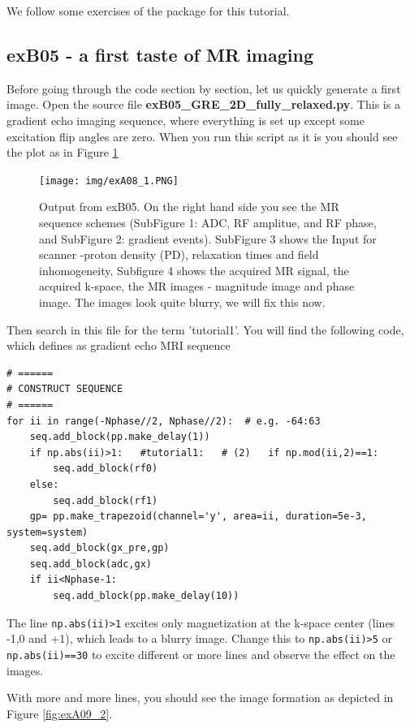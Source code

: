 \documentclass[a4paper,12pt]{extarticle}
\begin{document}
We follow some exercises of the package for this tutorial.

\subsection{exB05 - a first taste of MR imaging}
Before going through the code section by section, let us quickly generate a first image. Open the source file \textbf{exB05\_GRE\_2D\_fully\_relaxed.py}. This is a gradient echo imaging sequence, where everything is set up except some excitation flip angles are zero. When you run this script as it is you should see the plot as in Figure \ref{fig:exA08_1}

\begin{figure}[!ht] 
\centering
\texttt{[image: img/exA08\_1.PNG]}
\caption{Output from exB05. On the right hand side you see the MR sequence schemes (SubFigure 1: ADC, RF amplitue, and RF phase, and SubFigure 2: gradient events). SubFigure 3 shows the Input for scanner -proton density (PD), relaxation times and field inhomogeneity. Subfigure 4 shows the acquired MR signal, the acquired k-space, the MR images - magnitude image and phase image. The images look quite blurry, we will fix this now. }\label{fig:exA08_1}
\end{figure}

Then search in this file for the term 'tutorial1'. You will find the following code, which defines as gradient echo MRI sequence

\begin{verbatim}
# ======
# CONSTRUCT SEQUENCE
# ======
for ii in range(-Nphase//2, Nphase//2):  # e.g. -64:63
    seq.add_block(pp.make_delay(1))
    if np.abs(ii)>1:   #tutorial1:   # (2)   if np.mod(ii,2)==1:    
        seq.add_block(rf0)
    else:
        seq.add_block(rf1)
    gp= pp.make_trapezoid(channel='y', area=ii, duration=5e-3, system=system)
    seq.add_block(gx_pre,gp)
    seq.add_block(adc,gx)
    if ii<Nphase-1:
        seq.add_block(pp.make_delay(10))
\end{verbatim}

The line \texttt{np.abs(ii)>1} excites only magnetization at the k-space center (lines -1,0 and +1), which leads to a blurry image. Change this to \texttt{np.abs(ii)>5} or \texttt{np.abs(ii)==30}  to excite different or more lines and observe the effect on the images.


With more and more lines, you should see the image formation as depicted in Figure \ref{fig:exA09_2}.
\end{document}
